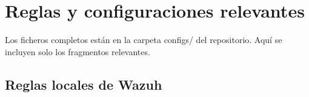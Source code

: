 \chapter{Reglas y configuraciones relevantes}\label{anx:configuraciones}

Los ficheros completos están en la carpeta configs/ del repositorio.
Aquí se incluyen solo los fragmentos relevantes.

\section{Reglas locales de Wazuh}

